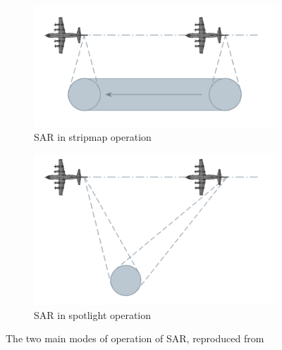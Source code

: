 \begin{figure}
	\centering
	\begin{subfigure}{.5\textwidth}
	\centering
	\includegraphics[width=0.45\linewidth]{../figures/sar_stripmap}	
	\caption{SAR in stripmap operation}
	\label{subfig:sar_stripmap}
	\end{subfigure}%
	\begin{subfigure}{.5\textwidth}
	\centering
	\includegraphics[width=0.45\linewidth]{../figures/sar_spotlight}	
	\caption{SAR in spotlight operation}
	\label{subfig:sar_spotlight}
	\end{subfigure}
	\caption{The two main modes of operation of SAR, reproduced from \cite{wolffSyntheticApertureRadar2012}}
	\label{fig:sar_modes}

\end{figure}

